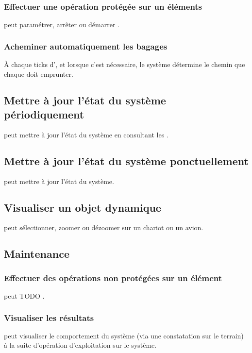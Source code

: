 \subsubsection{Effectuer une opération protégée sur un éléments}
 peut paramétrer, arrêter ou démarrer .

\subsubsection{Acheminer automatiquement les bagages}
À chaque ticks d', et lorsque c'est nécessaire, le système détermine le chemin que chaque  doit emprunter.

\subsection{Mettre à jour l'état du système périodiquement}
 peut mettre à jour l'état du système en consultant les .

\subsection{Mettre à jour l'état du système ponctuellement}
 peut mettre à jour l'état du système.

\subsection{Visualiser un objet dynamique}
 peut sélectionner, zoomer ou dézoomer sur un chariot ou un avion.

\subsection{Maintenance}

\subsubsection{Effectuer des opérations non protégées sur un élément}
 peut TODO .

\subsubsection{Visualiser les résultats}
 peut visualiser le comportement du système (via une constatation sur le terrain) à la suite d'opération d'exploitation sur le système.

